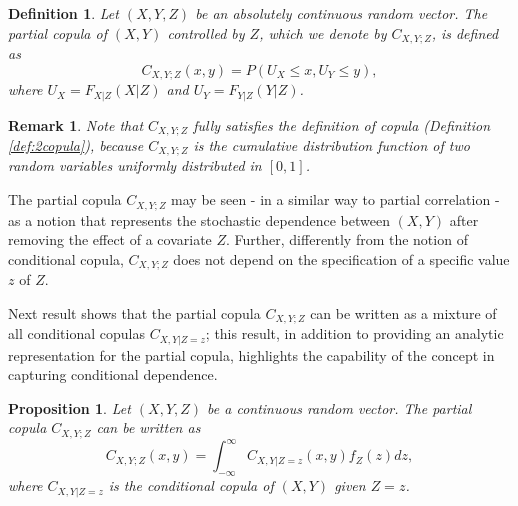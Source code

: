 \documentclass[
]{article}
\newtheorem{definition}{Definition}
\newtheorem{proposition}{Proposition}
\newtheorem{remark}{Remark}
\begin{document}
\begin{definition}
Let $(X, Y, Z)$ be an absolutely continuous random vector. The partial copula of $(X, Y)$ controlled by $Z$, which we denote by $C_{X,Y;Z}$, is defined as
$$C_{X,Y;Z}(x, y) = P(U_X\leq x, U_Y\leq y),$$
where $U_X= F_{X|Z}(X|Z)$ and $U_Y= F_{Y|Z}(Y|Z)$.
\end{definition}

\begin{remark}\label{rem:remark-2}
Note that $C_{X,Y;Z}$ fully satisfies the definition of copula (Definition \ref{def:2copula}), because $C_{X,Y;Z}$ is the cumulative distribution function of two random variables uniformly distributed in $[0,1]$.
\end{remark}

The partial copula \(C_{X,Y;Z}\) may be seen - in a similar way to
partial correlation - as a notion that represents the stochastic
dependence between \((X, Y)\) after removing the effect of a covariate
\(Z\). Further, differently from the notion of conditional copula,
\(C_{X,Y;Z}\) does not depend on the specification of a specific value
\(z\) of \(Z\).

Next result shows that the partial copula \(C_{X,Y;Z}\) can be written
as a mixture of all conditional copulas \(C_{X,Y|Z=z}\); this result, in
addition to providing an analytic representation for the partial copula,
highlights the capability of the concept in capturing conditional
dependence.

\begin{proposition}\label{prop:partial-copula}
Let $(X, Y, Z)$ be a continuous random vector. The partial copula $C_{X,Y;Z}$ can be written as
$$C_{X,Y;Z}(x, y) = \int_{-\infty}^{\infty} C_{X,Y|Z=z}(x, y) f_Z(z) dz,$$
where $C_{X,Y|Z=z}$ is the conditional copula of $(X, Y)$ given $Z = z$.
\end{proposition}
\end{document}
